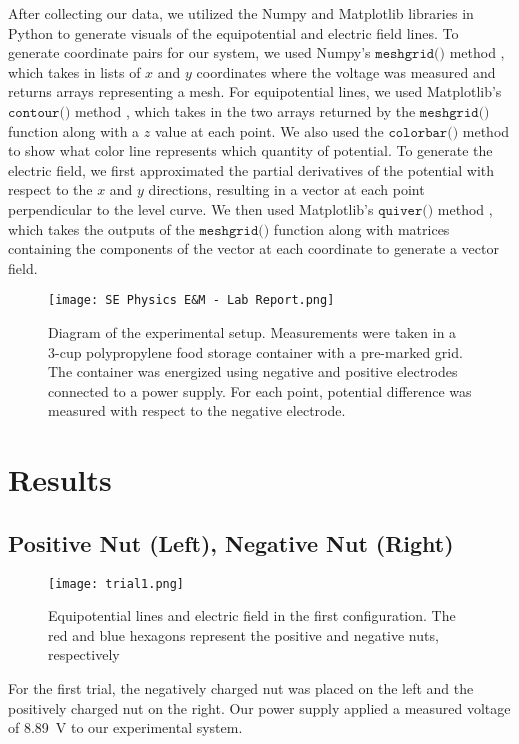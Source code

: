 \documentclass[10pt,journal,twoside]{IEEEtran}
\begin{document}
After collecting our data, we utilized the Numpy \cite{harris2020array} and Matplotlib \cite{hunter:2007} libraries in Python to generate visuals of the equipotential and electric field lines. To generate coordinate pairs for our system, we used Numpy’s $\texttt{meshgrid()}$ method \cite{hunter:2007}, which takes in lists of $x$ and $y$ coordinates where the voltage was measured and returns arrays representing a mesh. For equipotential lines, we used Matplotlib’s $\texttt{contour()}$ method \cite{hunter:2007}, which takes in the two arrays returned by the $\texttt{meshgrid()}$  function along with a $z$ value at each point. We also used the $\texttt{colorbar()}$ method to show what color line represents which quantity of potential. To generate the electric field, we first approximated the partial derivatives of the potential with respect to the $x$ and $y$ directions, resulting in a vector at each point perpendicular to the level curve. We then used Matplotlib’s $\texttt{quiver()}$ method \cite{hunter:2007}, which takes the outputs of the $\texttt{meshgrid()}$  function along with matrices containing the components of the vector at each coordinate to generate a vector field. 

\begin{figure}
\begin{center}
\texttt{[image: SE Physics E\&M - Lab Report.png]}
\end{center}
\caption{Diagram of the experimental setup. Measurements were taken in a 3-cup polypropylene food storage container with a pre-marked  grid. The container was energized using negative and positive electrodes connected to a power supply. For each point, potential difference was measured with respect to the negative electrode.}
\label{fig:1}
\end{figure}





\section{Results}

\subsection{Positive Nut (Left), Negative Nut (Right)}
\begin{figure}
\begin{center}
\texttt{[image: trial1.png]} %
\end{center}
\caption{Equipotential lines and electric field in the first configuration. The red and blue hexagons represent the positive and negative nuts, respectively}
\label{fig:2}
\end{figure}
For the first trial, the negatively charged nut was placed on the left and the positively charged nut on the right. Our power supply applied a measured voltage of \qty{8.89}{\volt} to our experimental system.
\end{document}
